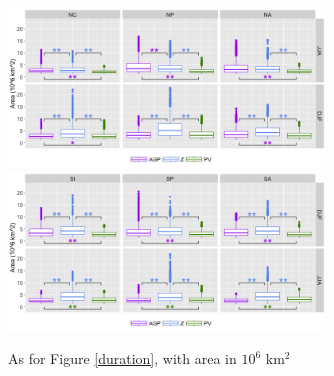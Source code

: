 \documentclass[smallextended]{svjour3}       %
\numberwithin{equation}{section}
\begin{document}
\begin{figure}
    \centering
    \includegraphics[width=0.75\textwidth]{fig_area_NH.png}
    \includegraphics[width=0.75\textwidth]{fig_area_SH.png}
    \caption{As for Figure \ref{duration}, with area in $10^6$ km$^2$}
    \label{size}
\end{figure} 



\end{document}
